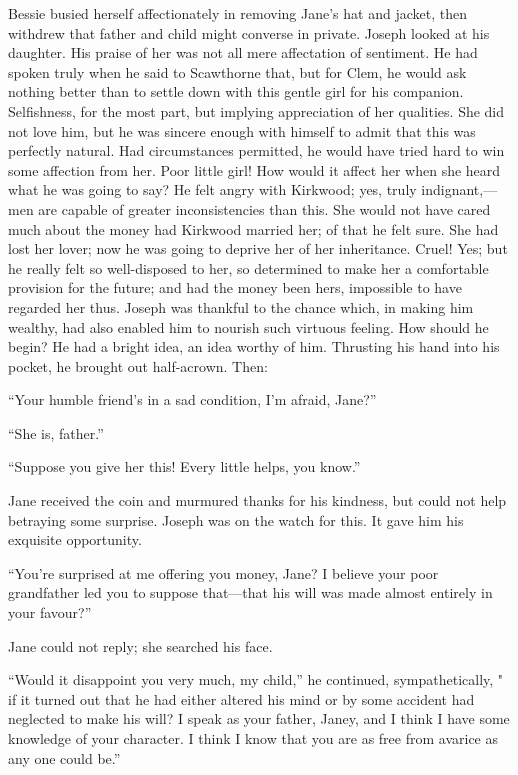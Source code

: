 {\protect\hypertarget{227}{}{}}Bessie busied herself affectionately in
removing Jane's hat and jacket, then withdrew that father and child
might converse in private. Joseph looked at his daughter. His praise of
her was not all mere affectation of sentiment. He had spoken truly when
he said to Scawthorne that, but for Clem, he would ask nothing better
than to settle down with this gentle girl for his companion.
Selfishness, for the most part, but implying appreciation of her
qualities. She did not love him, but he was sincere enough with himself
to admit that this was perfectly natural. Had circumstances permitted,
he would have tried hard to win some affection from her. Poor little
girl! How would it affect her when she heard what he was going to say?
He felt angry with Kirkwood; yes, truly indignant,---men are capable of
greater inconsistencies than this. She would not have cared much about
the money had Kirkwood married her; of that he felt sure. She had lost
her lover; now he was going to deprive her of her inheritance. Cruel!
Yes; but he really felt so well-disposed to her, so determined to make
her a comfortable provision for the future; and had the
{\protect\hypertarget{228}{}{}}money been hers, impossible to have
regarded her thus. Joseph was thankful to the chance which, in making
him wealthy, had also enabled him to nourish such virtuous feeling. How
should he begin? He had a bright idea, an idea worthy of him. Thrusting
his hand into his pocket, he brought out half-acrown. Then:

``Your humble friend's in a sad condition, I'm afraid, Jane?''

``She is, father.''

``Suppose you give her this! Every little helps, you know.''

Jane received the coin and murmured thanks for his kindness, but could
not help betraying some surprise. Joseph was on the watch for this. It
gave him his exquisite opportunity.

``You're surprised at me offering you money, Jane? I believe your poor
grandfather led you to suppose that---that his will was made almost
entirely in your favour?''

Jane could not reply; she searched his face.

``Would it disappoint you very much, my child,'' he continued,
sympathetically, " if it turned out that he had either altered his mind
{\protect\hypertarget{229}{}{}}or by some accident had neglected to make
his will? I speak as your father, Janey, and I think I have some
knowledge of your character. I think I know that you are as free from
avarice as any one could be.''

